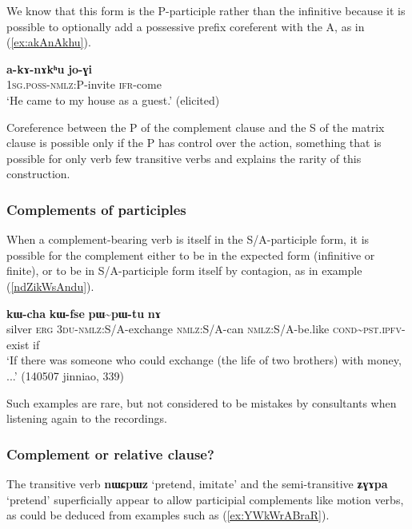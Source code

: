 \documentclass[oneside,a4paper,11pt]{article}
\newcommand{\ipa}[1]{\textbf{\phon#1}} %
\newcommand{\jpg}[2]{\ipa{#1} `#2'} %
\newcommand{\tld}{\textasciitilde{}}
\begin{document}
We know that this form is the P-participle rather than the infinitive because it is possible to optionally add a possessive prefix coreferent with the A, as in (\ref{ex:akAnAkhu}).

\begin{exe}
\ex \label{ex:akAnAkhu}
\gll 
\ipa{a-kɤ-nɤkʰu} 	\ipa{jo-ɣi}  \\
 \textsc{1sg.poss-nmlz:P}-invite \textsc{ifr}-come \\
\glt `He came to my house as a guest.' (elicited)
\end{exe}

Coreference between the P of the complement clause and the S of the matrix clause is possible only if the P has control over the action, something that is possible for only verb few transitive verbs and explains the rarity of this construction. 
    
\subsubsection{Complements of participles}
When a complement-bearing verb is itself in the S/A-participle form, it is possible for the complement either to be in the expected form (infinitive or finite), or to be in S/A-participle form itself by contagion, as in example (\ref{ndZikWsAndu}).

\begin{exe}
\ex \label{ndZikWsAndu}
\gll [\ipa{rŋɯl} 	\ipa{kɯ} 	\ipa{ndʑi-kɯ-sɤndu}] 	\ipa{kɯ-cha} 	\ipa{kɯ-fse} 	\ipa{pɯ\tld{}pɯ-tu} 	\ipa{nɤ} \\
silver \textsc{erg} \textsc{3du-nmlz}:S/A-exchange \textsc{nmlz}:S/A-can \textsc{nmlz}:S/A-be.like 
\textsc{cond}\tld{}\textsc{pst.ipfv}-exist if \\
\glt `If there was someone who could exchange (the life of two brothers) with money, ...' (140507 jinniao, 339)
\end{exe}

Such examples are rare, but not considered to be mistakes by consultants when listening again to the recordings.

\subsubsection{Complement or relative clause?} \label{sec:relative.q}
The transitive verb \jpg{nɯɕpɯz}{pretend, imitate} and the semi-transitive \jpg{ʑɣɤpa}{pretend} superficially appear to allow participial complements like motion verbs, as could be deduced from examples such as (\ref{ex:YWkWrABraR}). 
\end{document}
